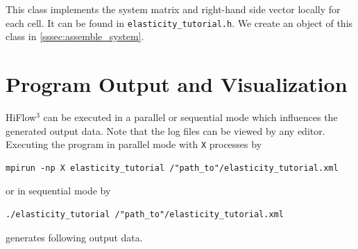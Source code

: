 \documentclass[a4paper, 11pt, twoside]{article}
\theoremstyle{plain}
\theoremstyle{definition}
\begin{document}
This class implements the system matrix and right-hand side vector locally for each cell. 
It can be found in \verb'elasticity_tutorial.h'.
We create an object of this class in \ref{sssec:assemble_system}.



















\section{Program Output and Visualization}
HiFlow$^3$ can be executed in a parallel or sequential mode which influences the generated output data. 
Note that the log files can be viewed by any editor.
Executing the program in parallel mode with \verb'X' processes by
\begin{lstlisting}[breaklines]
  mpirun -np X elasticity_tutorial /"path_to"/elasticity_tutorial.xml
\end{lstlisting}
or in sequential mode by
\begin{lstlisting}[breaklines]
  ./elasticity_tutorial /"path_to"/elasticity_tutorial.xml
\end{lstlisting}
generates following output data.
\end{document}
